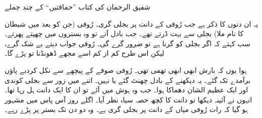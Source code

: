 \documentclass{article}
\begin{document}

   \begin{center} \Large          %
      شفیق الرحمان کی کتاب ''حماقتیں`` کے چند جملے
   \end{center}
   \vspace{2\baselineskip}    %

   یہ ان دنوں کا ذکر ہے جب رُوفی کے دانت پر بجلی گری۔ رُوفی (جن کو بعد میں شیطان کا نام ملا) بجلی سے بہت ڈرتے تھے۔ جب بادل آتے تو وہ بستروں میں چھپتے پھرتے۔ سب کہتے کہ اگر بجلی کو گرنا ہے تو ضرور گرے گی۔ رُوفی جواب دیتے بے شک گرے، لیکن اس طرح کم از کم اسے مجھے ڈھونڈنا تو پڑے گا۔
   
   ہوا یوں کہ بارش ابھی ابھی تھمی تھی۔ رُوفی صوفے کے پیچھے سے نکل کردبے پاؤں برآمدے تک گئے۔ یہ دیکھنے کے بادل چھنٹ گئے یا نہیں۔ اتنے میں زور سے بجلی کوندی اور ایک عظیم الشان دھماکا ہوا۔ جب وہ ہوش میں آئے تو ان کا ایک دانت ہل رہا تھا۔ انہوں نے آئینہ دیکھا تو دانت کا کچھ حصہ سیاہ نظر آیا۔ اگلے روز آس پاس میں مشہور ہو گیا کہ رات رُوفی میاں کے دانت پر بجلی گری ہے۔ وہ دو دن تک بستر پر پڑے رہے۔
\end{document}
